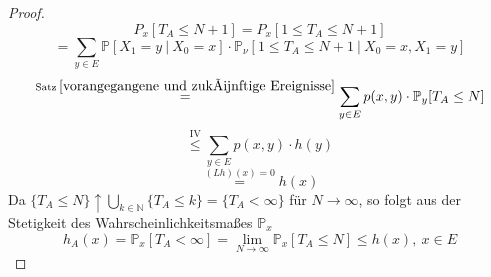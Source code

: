 \documentclass[a4paper,12pt]{scrartcl}
\theoremstyle{definition}
\begin{document}
\begin{proof}
\begin{equation*}
P_{x}[T_{A} \leq N+1] = P_{x}[1 \leq T_{A} \leq N+1]
\end{equation*}
\begin{equation*}
= \sum_{y \in E} \mathbb{P}[X_{1} = y \: | \: X_{0} = x] \cdot \mathbb{P}_{\nu}[1 \leq T_{A} \leq N+1 \: | \: X_{0} = x, X_{1} = y]
\end{equation*}
\begin{equation*}
\stackrel{\mathrm{Satz} \: \ref{vorangegangene und zukünftige Ereignisse}}{=} \sum_{y \in E} p(x,y) \cdot \mathbb{P}_{y}[T_{A} \leq N]
\end{equation*}
\begin{equation*}
\stackrel{\mathrm{IV}}{\leq}\sum_{y \in E} p(x,y) \cdot h(y)
\end{equation*}
\begin{equation*}
\stackrel{(Lh)(x) = 0}{=}h(x)
\end{equation*}
Da $\lbrace T_{A} \leq N \rbrace \uparrow \bigcup_{k \in \mathbb{N}} \lbrace T_{A} \leq k \rbrace = \lbrace T_{A} < \infty \rbrace$ für $N \to \infty$, so folgt aus der Stetigkeit des Wahrscheinlichkeitsmaßes $\mathbb{P}_{x}$
\begin{equation*}
h_{A}(x) = \mathbb{P}_{x}[T_{A} < \infty] = \lim_{N \to \infty} \mathbb{P}_{x}[T_{A} \leq N] \leq h(x), \: x \in E
\end{equation*}
\end{proof}
\end{document}
